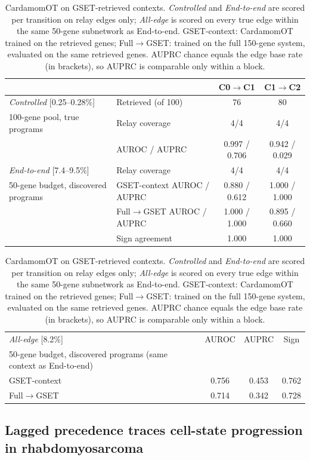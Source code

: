 \documentclass[10pt, letterpaper]{article}
\begin{document}
\begin{table}[h]
\centering
\small
\caption{CardamomOT on GSET-retrieved contexts. \textit{Controlled} and \textit{End-to-end} are scored per transition on relay edges only; \textit{All-edge} is scored on every true edge within the same 50-gene subnetwork as End-to-end. GSET-context: CardamomOT trained on the retrieved genes; Full$\to$GSET: trained on the full 150-gene system, evaluated on the same retrieved genes. AUPRC chance equals the edge base rate (in brackets), so AUPRC is comparable only within a block.}
\label{tab:cardamom-experiments}
\setlength{\tabcolsep}{5pt}
\begin{tabular}{llcc}
\toprule
 & & C0$\to$C1 & C1$\to$C2 \\
\midrule
\textit{Controlled} [0.25--0.28\%] & Retrieved (of 100) & 76 & 80 \\
100-gene pool, true programs & Relay coverage & 4/4 & 4/4 \\
 & AUROC / AUPRC & 0.997 / 0.706 & 0.942 / 0.029 \\
\midrule
\textit{End-to-end} [7.4--9.5\%] & Relay coverage & 4/4 & 4/4 \\
50-gene budget, discovered programs & GSET-context AUROC / AUPRC & 0.880 / 0.612 & 1.000 / 1.000 \\
 & Full$\to$GSET AUROC / AUPRC & 1.000 / 1.000 & 0.895 / 0.660 \\
 & Sign agreement & 1.000 & 1.000 \\
\bottomrule
\end{tabular}

\vspace{0.3cm}

\begin{tabular}{lccc}
\toprule
\textit{All-edge} [8.2\%] & AUROC & AUPRC & Sign \\
50-gene budget, discovered programs (same context as End-to-end) & & & \\
\midrule
GSET-context & 0.756 & 0.453 & 0.762 \\
Full$\to$GSET & 0.714 & 0.342 & 0.728 \\
\bottomrule
\end{tabular}
\end{table}


\subsection{Lagged precedence traces cell-state progression in rhabdomyosarcoma}
\label{sec:rms}
\end{document}
